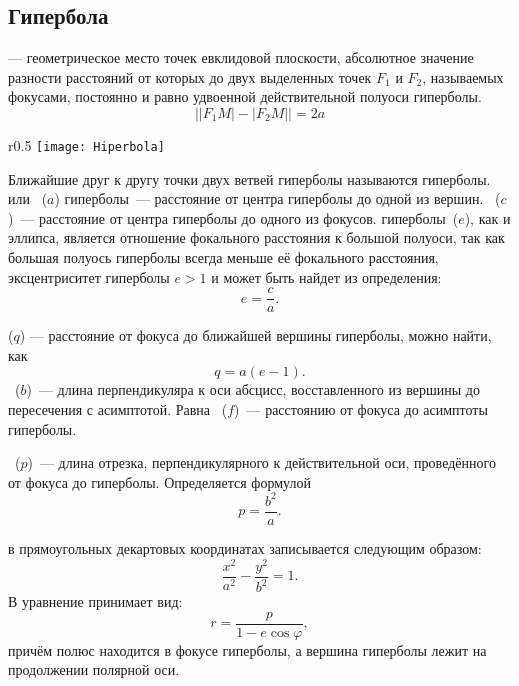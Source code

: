\subsection{Гипербола}

{\bfseries {}} --- геометрическое место точек евклидовой плоскости, абсолютное значение разности расстояний от которых до двух выделенных точек $F_1$ и $F_2$, называемых фокусами, постоянно и равно удвоенной действительной полуоси гиперболы.
\begin{equation}
	\bigl||F_1M|-|F_2M|\bigr| = 2a
\end{equation}

\begin{wrapfigure}[14]{r}{0.5\tw}
	\vspace{-1pc}
	\texttt{[image: Hiperbola]}
\end{wrapfigure}
Ближайшие друг к другу точки двух ветвей гиперболы называются  гиперболы.  или ~($a$) гиперболы~--- расстояние от центра гиперболы до одной из вершин. ~($c$)~---  расстояние от центра гиперболы до одного из фокусов.  гиперболы~($e$), как и  эллипса, является отношение фокального расстояния к большой полуоси, так как большая полуось гиперболы всегда меньше её фокального расстояния, эксцентриситет гиперболы $e > 1$ и может быть найдет из определения:
\begin{equation}
	e=\frac{c}{a}.
\end{equation}

 ($q$) --- расстояние от фокуса до ближайшей вершины гиперболы, можно найти, как
\begin{equation}
	q = a ( e - 1).
\end{equation}
~($b$)~--- длина перпендикуляра к оси абсцисс, восставленного из вершины до пересечения с асимптотой. Равна ~($f$)~--- расстоянию от фокуса до асимптоты гиперболы.

~($p$)~--- длина отрезка, перпендикулярного к действительной оси, проведённого от фокуса до гиперболы. Определяется формулой
\begin{equation}
	p=\frac{b^2}{a}.
\end{equation}

 в прямоугольных декартовых координатах записывается следующим образом:
\begin{equation}
	\frac{x^2}{a^2}-\frac{y^2}{b^2}=1.
\end{equation}
В  уравнение принимает вид:
\begin{equation}
	r=\frac{p}{1-e\cos\varphi},
\end{equation}
причём полюс находится в фокусе гиперболы, а вершина гиперболы лежит на продолжении полярной оси.

